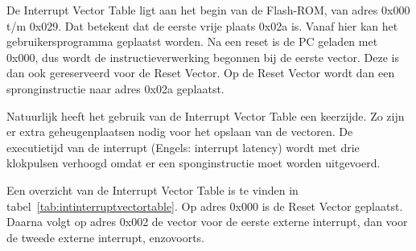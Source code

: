 De Interrupt Vector Table ligt aan het begin van de Flash-ROM, van adres
0x000 t/m 0x029. Dat betekent dat de eerste vrije plaats 0x02a is. Vanaf
hier kan het gebruikersprogramma geplaatst worden. Na een reset is de PC
geladen met 0x000, dus wordt de instructieverwerking begonnen bij de eerste
vector. Deze is dan ook gereserveerd voor de Reset Vector. Op de Reset Vector
wordt dan een spronginstructie naar adres 0x02a geplaatst.

Natuurlijk heeft het gebruik van de Interrupt Vector Table een keerzijde.
Zo zijn er extra geheugenplaatsen nodig voor het opslaan van de vectoren.
De executietijd van de interrupt (Engels: interrupt latency) wordt met
drie klokpulsen verhoogd omdat er een sponginstructie moet worden uitgevoerd.

Een overzicht van de Interrupt Vector Table is te vinden in
tabel~\ref{tab:intinterruptvectortable}. Op adres 0x000 is de Reset Vector
geplaatst. Daarna volgt op adres 0x002 de vector voor de eerste externe
interrupt, dan voor de tweede externe interrupt, enzovoorts.

